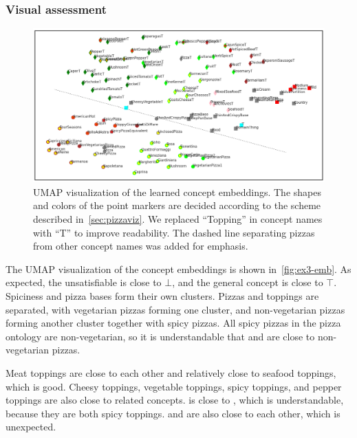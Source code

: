 \subsubsection{Visual assessment}

\begin{figure}
\centering\includegraphics[width=\textwidth]{figures/ex3-emb.png}
\caption{UMAP visualization of the learned concept embeddings. The shapes and colors of the point markers are decided according to the scheme described in~\autoref{sec:pizzaviz}. We replaced ``Topping'' in concept names with ``T'' to improve readability. The dashed line separating pizzas from other concept names was added for emphasis.}
\label{fig:ex3-emb}
\end{figure}

The UMAP visualization of the concept embeddings is shown in~\autoref{fig:ex3-emb}.
As expected, the unsatisfiable  is close to $\bot$, and the general  concept is close to $\top$.
Spiciness and pizza bases form their own clusters.
Pizzas and toppings are separated, with vegetarian pizzas forming one cluster, and non-vegetarian pizzas forming another cluster together with spicy pizzas.
All spicy pizzas in the pizza ontology are non-vegetarian, so it is understandable that  and  are close to non-vegetarian pizzas.

Meat toppings are close to each other and relatively close to seafood toppings, which is good.
Cheesy toppings, vegetable toppings, spicy toppings, and pepper toppings are also close to related concepts.
 is close to , which is understandable, because they are both spicy toppings.
 and  are also close to each other, which is unexpected. 


